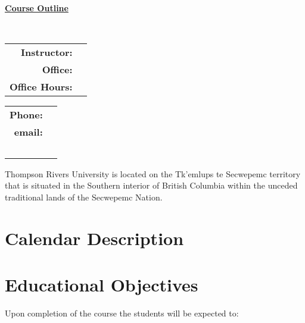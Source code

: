 \documentclass[10pt]{trumathoutline}
\begin{document}
	
	~
	
	\vspace{-1em}
	
	\begin{center}
		\bfseries
		{\Large \underline{Course Outline}}\\[0.5em]
		
		\coursecode
		
		\coursetitle\ \coursevectoring
		
		\term
		
	\end{center}
\begin{tabular}{ r l}
	\textbf{Instructor:}	& \instructorname 	\\
	\textbf{Office:} 		& \instructorofficerm \\
	\textbf{Office Hours:} 	& \instructorofficehrs
\end{tabular}\hfill
\begin{tabular}{ r l}
	 \textbf{Phone:} & \instructorphone\\
	 \textbf{email:} & \href{mailto:\instructoremail}{\instructoremail}\\
	~
\end{tabular}

\vspace{1em}


Thompson Rivers University is located on the Tk’emlups te Secwepemc territory that is situated in the Southern interior of British Columbia within the unceded traditional lands of the Secwepemc Nation.

\section*{Calendar Description}
\begin{quote}
	\calendardescription
\end{quote}
	


\section*{Educational Objectives}
Upon completion of the course the students will be expected to:
\courseobjectives
\end{document}
